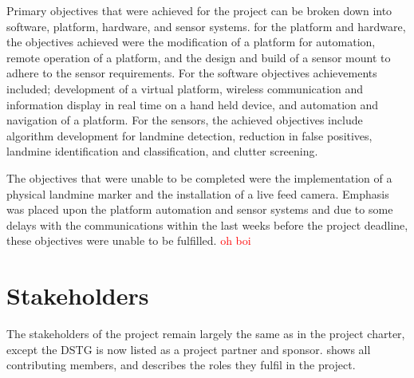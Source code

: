 \documentclass[main.tex]{subfiles}
\begin{document}
Primary objectives that were achieved for the project can be broken down into software, platform, hardware, and sensor systems. for the platform and hardware, the objectives achieved were the modification of a platform for automation, remote operation of a platform, and the design and build of a sensor mount to adhere to the sensor requirements. For the software objectives achievements included; development of a virtual platform, wireless communication and information display in real time on a hand held device, and automation and navigation of a platform. For the sensors, the achieved objectives include algorithm development for landmine detection, reduction in false positives, landmine identification and classification, and clutter screening.

The objectives that were unable to be completed were the implementation of a physical landmine marker and the installation of a live feed camera. Emphasis was placed upon the platform automation and sensor systems and due to some delays with the communications within the last weeks before the project deadline, these objectives were unable to be fulfilled.  \textcolor{red}{oh boi}


\section{Stakeholders}

The stakeholders of the project remain largely the same as in the project charter, except the DSTG is now listed as a project partner and sponsor.  shows all contributing members, and describes the roles they fulfil in the project.  
\end{document}
